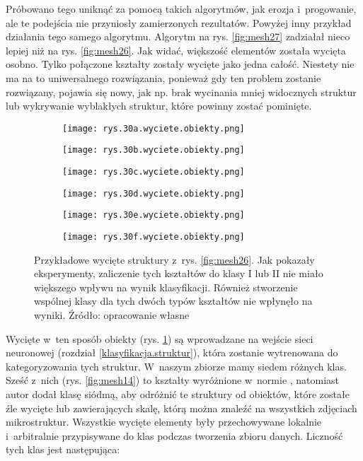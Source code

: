 Próbowano tego uniknąć za pomocą takich algorytmów, jak erozja i~progowanie, ale te podejścia nie przyniosły zamierzonych rezultatów. Powyżej inny przykład działania tego samego algorytmu.
Algorytm na rys. \ref{fig:mesh27} zadziałał nieco lepiej niż na rys. \ref{fig:mesh26}. Jak widać, większość elementów została wycięta osobno. Tylko połączone kształty zostały wycięte jako jedna całość. Niestety nie ma na to uniwersalnego rozwiązania, ponieważ gdy ten problem zostanie rozwiązany, pojawia się nowy, jak np. brak wycinania mniej widocznych struktur lub wykrywanie wyblakłych struktur, które powinny zostać pominięte.
\begin{figure}[h]
	\centering
	\begin{subfigure}{0.29\textwidth}
	    \centering
	    \texttt{[image: rys.30a.wyciete.obiekty.png]}
	\end{subfigure}
	\begin{subfigure}{0.29\textwidth}
	    \centering
	    \texttt{[image: rys.30b.wyciete.obiekty.png]}
	\end{subfigure}
	\begin{subfigure}{0.29\textwidth}
	    \centering
	    \texttt{[image: rys.30c.wyciete.obiekty.png]}
	\end{subfigure}
	\begin{subfigure}{0.29\textwidth}
	    \centering
	    \texttt{[image: rys.30d.wyciete.obiekty.png]}
	\end{subfigure}
	\begin{subfigure}{0.29\textwidth}
	    \centering
	    \texttt{[image: rys.30e.wyciete.obiekty.png]}
	\end{subfigure}
	\begin{subfigure}{0.29\textwidth}
	    \centering
	    \texttt{[image: rys.30f.wyciete.obiekty.png]}
	\end{subfigure}
	\caption{\label{fig:mesh28}Przykładowe wycięte struktury z~rys. \ref{fig:mesh26}. Jak pokazały eksperymenty, zaliczenie tych kształtów do klasy I lub II nie miało większego wpływu na wynik klasyfikacji. Również stworzenie wspólnej klasy dla tych dwóch typów kształtów nie wpłynęło na wyniki. Źródło: opracowanie własne}
\end{figure}
Wycięte w~ten sposób obiekty (rys. \ref{fig:mesh28}) są wprowadzane na wejście sieci neuronowej (rozdział \ref{klasyfikacja.struktur}), która zostanie wytrenowana do kategoryzowania tych struktur. W~naszym zbiorze mamy siedem różnych klas. Sześć z~nich (rys. \ref{fig:mesh14}) to kształty wyróżnione w~normie \cite{norma}, natomiast autor dodał klasę siódmą, aby odróżnić te struktury od obiektów, które zostałe źle wycięte lub zawierających skalę, którą można znaleźć na wszystkich zdjęciach mikrostruktur. Wszystkie wycięte elementy były przechowywane lokalnie i~arbitralnie przypisywane do klas podczas tworzenia zbioru danych. Liczność tych klas jest następująca:
